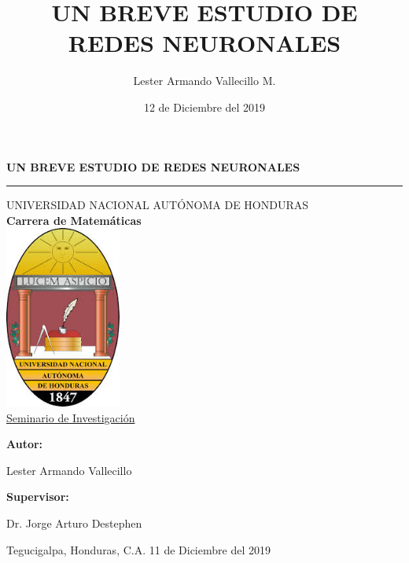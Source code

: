 \documentclass[11pt,titlepage]{report}
\title{UN BREVE ESTUDIO DE REDES NEURONALES}
\author{Lester Armando Vallecillo M.}
\date{12 de Diciembre del 2019}
\begin{document}
	


\begin{titlepage}
  \vspace*{1cm}
\begin{center}
  		\Huge{\textbf{UN BREVE ESTUDIO DE REDES NEURONALES}}
\end{center}
\vspace*{1cm}
    
\hrule
  
 \begin{center}
	{\LARGE{UNIVERSIDAD NACIONAL AUTÓNOMA DE HONDURAS}}\\
	{\LARGE \textbf{Carrera de Matemáticas}}\\[0.4cm] 
 	\includegraphics[height=6cm]{Pic/UNAH}\\[0.3cm]
 	{\LARGE\underline{ Seminario de Investigación}}\\ 
 \end{center}
\begin{center}
	\begin{list}{}{}
	\item \begin{center}
		\textbf{Autor:}
	\end{center}
	\item \begin{center}
		Lester Armando Vallecillo
	\end{center}
	\item \begin{center}
		\textbf{Supervisor:}
	\end{center}
	\item \begin{center}
		Dr. Jorge Arturo Destephen\\[1.5cm]
	\end{center}
\end{list}
\end{center}
   {\large Tegucigalpa, Honduras, C.A. \hfill 11 de Diciembre del 2019}
\end{titlepage}
\end{document}

